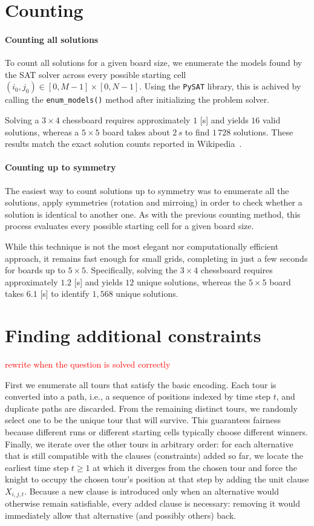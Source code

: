 \documentclass[a4paper, 11pt]{article}
\begin{document}
\section{Counting}
\paragraph{Counting all solutions}
To count all solutions for a given board size, we enumerate the models found by the SAT solver across every possible starting cell $(i_0, j_0) \in [0, M-1] \times [0, N-1]$. Using the \texttt{PySAT} library, this is achived by calling the \texttt{enum\_models()} method after initializing the problem solver.

Solving a $3 \times 4$ chessboard requires approximately $1$ [s] and yields $16$ valid solutions, whereas a $5 \times 5$ board takes about $2\,s$ to find $1\,728$ solutions. These results match the exact solution counts reported in Wikipedia~\cite{wikipedia_knights_tour}.

\paragraph{Counting up to symmetry}
The easiest way to count solutions up to symmetry was to enumerate all the solutions, apply symmetries (rotation and mirroing) in order to check whether a solution is identical to another one. As with the previous counting method, this process evaluates every possible starting cell for a given board size. 

While this technique is not the most elegant nor computationally efficient approach, it remains fast enough for small grids, completing in just a few seconds for boards up to $5 \times 5$. Specifically, solving the $3 \times 4$ chessboard requires approximately $1.2$ [s] and yields $12$ unique solutions, whereas the $5 \times 5$ board takes $6.1$ [s] to identify $1,568$ unique solutions.

\section{Finding additional constraints}

\textcolor{red}{rewrite when the question is solved correctly}

First we enumerate all tours that satisfy the basic encoding. 
Each tour is converted into a path, i.e., a sequence of positions indexed by time step $t$, and duplicate paths are discarded.
From the remaining distinct tours, we randomly select one to be the unique tour that will survive.
This guarantees fairness because different runs or different starting cells typically choose different winners.
Finally, we iterate over the other tours in arbitrary order: 
for each alternative that is still compatible with the clauses (constraints) added so far, 
we locate the earliest time step $t \ge 1$ at which it diverges from the chosen tour and force the knight to occupy the chosen tour's position at that step by adding the unit clause $X_{i,j,t}$. 
Because a new clause is introduced only when an alternative would otherwise remain satisfiable, every added clause is necessary: removing it would immediately allow that alternative (and possibly others) back.



\end{document}
